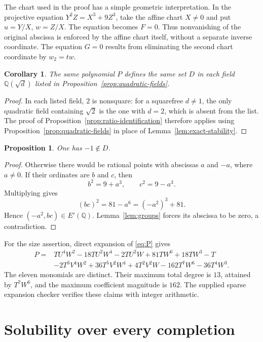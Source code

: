 \documentclass[11pt,a4paper]{article}
\newtheorem{proposition}[theorem]{Proposition}
\newtheorem{corollary}[theorem]{Corollary}
\theoremstyle{definition}
\newcommand{\Q}{\mathbb Q}\newcommand{\Z}{\mathbb Z}
\begin{document}
The chart used in the proof has a simple geometric interpretation.
In the projective equation $Y^2Z=X^3+9Z^3$, take the affine chart
$X\ne0$ and put $u=Y/X$, $w=Z/X$. The equation becomes $F=0$.
Thus nonvanishing of the original abscissa is enforced by the affine
chart itself, without a separate inverse coordinate. The equation
$G=0$ results from eliminating the second chart coordinate by
$w_2=tw$.

\begin{corollary}\label{cor:same-polynomial}
The same polynomial $P$ defines the same set $D$ in each field
$\Q(\sqrt d)$ listed in Proposition~\ref{prop:quadratic-fields}.
\end{corollary}
\begin{proof}
In each listed field, $2$ is nonsquare: for a squarefree $d\ne1$,
the only quadratic field containing $\sqrt2$ is the one with
$d=2$, which is absent from the list. The proof of
Proposition~\ref{prop:ratio-identification} therefore applies
using Proposition~\ref{prop:quadratic-fields} in place of
Lemma~\ref{lem:exact-stability}.
\end{proof}

\begin{proposition}\label{prop:minus-one}
One has $-1\notin D$.
\end{proposition}
\begin{proof}
Otherwise there would be rational points with abscissas $a$ and $-a$,
where $a\ne0$. If their ordinates are $b$ and $c$, then
\[
          b^2=9+a^3,\qquad c^2=9-a^3.
\]
Multiplying gives
\[
                    (bc)^2=81-a^6=(-a^2)^3+81.
\]
Hence $(-a^2,bc)\in E'(\Q)$. Lemma~\ref{lem:groups} forces its
abscissa to be zero, a contradiction.
\end{proof}

For the size assertion, direct expansion of \eqref{eq:P} gives
\begin{align*}
 P={}&TU^4W^2-18TU^2W^4-2TU^2W+81TW^6+18TW^3-T\\
     &-2T^3V^4W^2+36T^5V^2W^4+4T^2V^2W
       -162T^7W^6-36T^4W^3.
\end{align*}
The eleven monomials are distinct. Their maximum total degree is
$13$, attained by $T^7W^6$, and the maximum coefficient magnitude
is $162$. The supplied sparse expansion checker verifies these
claims with integer arithmetic.

\section{Solubility over every completion}\label{sec:local}
\end{document}
